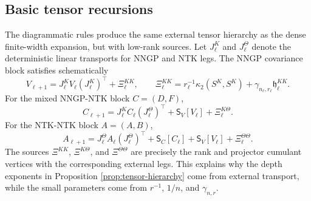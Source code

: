 \documentclass{article}
\begin{document}
\subsection{Basic tensor recursions}
The diagrammatic rules produce the same external tensor hierarchy as the dense finite-width expansion, but with low-rank sources. Let \(J^K_\ell\) and \(J^\Theta_\ell\) denote the deterministic linear transports for NNGP and NTK legs. The NNGP covariance block satisfies schematically
\begin{equation}
V_{\ell+1}
=J^K_\ell V_\ell (J^K_\ell)^\top+\Xi^{KK}_\ell,
\qquad
\Xi^{KK}_\ell
=r_\ell^{-1}\kappa_2(S^K,S^K)
+\gamma_{n_\ell,r_\ell}\mathfrak h^{KK}_\ell.
\label{eq:appendix-V-rec}
\end{equation}
For the mixed NNGP-NTK block \(C=(D,F)\),
\begin{equation}
C_{\ell+1}
=J^K_\ell C_\ell (J^\Theta_\ell)^\top
+\mathsf S_V[V_\ell]
+\Xi^{K\Theta}_\ell.
\label{eq:appendix-C-rec}
\end{equation}
For the NTK-NTK block \(A=(A,B)\),
\begin{equation}
A_{\ell+1}
=J^\Theta_\ell A_\ell (J^\Theta_\ell)^\top
+\mathsf S_C[C_\ell]+\mathsf S_V[V_\ell]
+\Xi^{\Theta\Theta}_\ell.
\label{eq:appendix-A-rec}
\end{equation}
The sources \(\Xi^{KK}\), \(\Xi^{K\Theta}\), and \(\Xi^{\Theta\Theta}\) are precisely the rank and projector cumulant vertices with the corresponding external legs. This explains why the depth exponents in Proposition \ref{prop:tensor-hierarchy} come from external transport, while the small parameters come from \(r^{-1}\), \(1/n\), and \(\gamma_{n,r}\).
\end{document}

